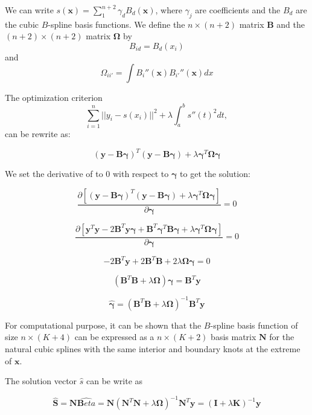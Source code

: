 \documentclass[]{book}
\begin{document}
We can write \(s(\mathbf{x}) = \sum_1^{n+2}\gamma_d\mathit{B}_d(\mathbf{x})\), where
\(\gamma_j\) are coefficients and the \(\mathit{B}_d\) are the cubic
\(\mathit{B}\)-spline basis functions. We define the \(n \times (n+2)\)
matrix \textbf{\(\mathbf{B}\)} and the \((n+2) \times (n+2)\) matrix
\textbf{\(\mathbf{\Omega}\)} by \[\mathit{B}_{id} = \mathit{B}_d(x_i)\] and
\[\Omega_{ii'} = \int \mathit{B}_i''(\mathbf{x}) \mathit{B}_{i'}''(\mathbf{x}) dx\]

The optimization criterion
\[\sum_{i=1}^n||y_i - s(x_i)||^2 + \lambda \int_a^b{s''(t)}^2dt,\] can
be rewrite as:

\[(\mathbf{y} - \mathbf{B}\boldsymbol{\gamma})^T(\mathbf{y} - \mathbf{B}\boldsymbol{\gamma}) +
\lambda\boldsymbol{\gamma}^T\boldsymbol{\Omega}\boldsymbol{\gamma} 
\label{eq:optiBspline}\]

We set the derivative of to 0 with respect to \(\boldsymbol{\gamma}\) to get the
solution:

\[\frac{\partial [(\mathbf{y} - \mathbf{B}\boldsymbol{\gamma})^T(\mathbf{y} - \mathbf{B}\boldsymbol{\gamma}) +
\lambda\boldsymbol{\gamma}^T\mathbf{\Omega}\boldsymbol{\gamma}]}{\partial \boldsymbol{\gamma}} = 0\]

\[\frac{\partial [\mathbf{y}^T\mathbf{y} - 2 \mathbf{B}^T\mathbf{y}\boldsymbol{\gamma} + \mathbf{B}^T\boldsymbol{\gamma}^T \mathbf{B}\boldsymbol{\gamma} + \lambda\boldsymbol{\gamma}^T\boldsymbol{\Omega}\boldsymbol{\gamma}]}{\partial \boldsymbol{\gamma}} = 0\]

\[-2\mathbf{B}^T\mathbf{y} + 2\mathbf{B}^T\mathbf{B} + 2\lambda\boldsymbol{\Omega}\boldsymbol{\gamma} = 0\]

\[(\mathbf{B}^T\mathbf{B} + \lambda\boldsymbol{\Omega})\boldsymbol{\gamma} = \mathbf{B}^T\mathbf{y}\]

\[\hat{\boldsymbol{\gamma}} = (\mathbf{B}^T\mathbf{B} + \lambda\boldsymbol{\Omega})^{-1}\mathbf{B}^T\mathbf{y}\]

For computational purpose, it can be shown \citep{hastie_generalized_1990}
that the \(\mathit{B}\)-spline basis function of size
\(n \times (\mathit{K} + 4)\) can be expressed as a
\(n \times (\mathit{K} + 2)\) basis matrix \(\mathbf{N}\) for the natural
cubic splines with the same interior and boundary knots at the extreme
of \(\mathbf{x}\).

The solution vector \(\hat{s}\) can be write as

\[\hat{\mathbf{S}} = \mathbf{N}\hat{\mathbf{B}eta} = \mathbf{N}(\mathbf{N}^T\mathbf{N} + \lambda\mathbf{\Omega})^{-1}\mathbf{N}^T\mathbf{y} = (\mathbf{I} + \lambda\mathbf{K})^{-1}\mathbf{y}\]
\end{document}
